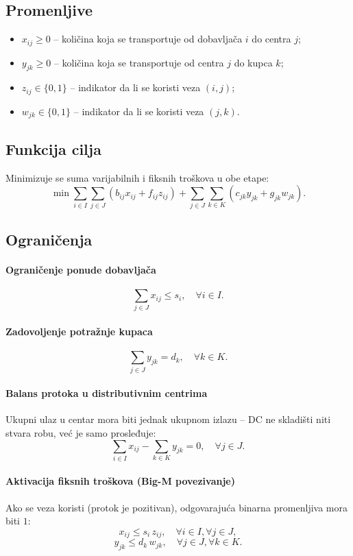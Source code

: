 \documentclass[12pt,a4paper]{article}
\begin{document}
\subsection{Promenljive}
\begin{itemize}
    \item $x_{ij} \ge 0$ -- količina koja se transportuje od dobavljača $i$ do centra $j$;
    \item $y_{jk} \ge 0$ -- količina koja se transportuje od centra $j$ do kupca $k$;
    \item $z_{ij} \in \{0,1\}$ -- indikator da li se koristi veza $(i,j)$;
    \item $w_{jk} \in \{0,1\}$ -- indikator da li se koristi veza $(j,k)$.
\end{itemize}

\subsection{Funkcija cilja}
Minimizuje se suma varijabilnih i fiksnih troškova u obe etape:
\[
\min \sum_{i \in I}\sum_{j \in J} \left( b_{ij}x_{ij} + f_{ij}z_{ij} \right)
+ \sum_{j \in J}\sum_{k \in K} \left( c_{jk}y_{jk} + g_{jk}w_{jk} \right).
\]

\subsection{Ograničenja}

\paragraph{Ograničenje ponude dobavljača}
\[
\sum_{j \in J} x_{ij} \le s_i, \quad \forall i \in I.
\]

\paragraph{Zadovoljenje potražnje kupaca}
\[
\sum_{j \in J} y_{jk} = d_k, \quad \forall k \in K.
\]

\paragraph{Balans protoka u distributivnim centrima}
Ukupni ulaz u centar mora biti jednak ukupnom izlazu -- DC ne skladišti
niti stvara robu, već je samo prosleđuje:
\[
\sum_{i \in I} x_{ij} - \sum_{k \in K} y_{jk} = 0, \quad \forall j \in J.
\]

\paragraph{Aktivacija fiksnih troškova (Big-M povezivanje)}
Ako se veza koristi (protok je pozitivan), odgovarajuća binarna promenljiva
mora biti $1$:
\[
x_{ij} \le s_i\, z_{ij}, \quad \forall i \in I, \forall j \in J,
\]
\[
y_{jk} \le d_k\, w_{jk}, \quad \forall j \in J, \forall k \in K.
\]
\end{document}
